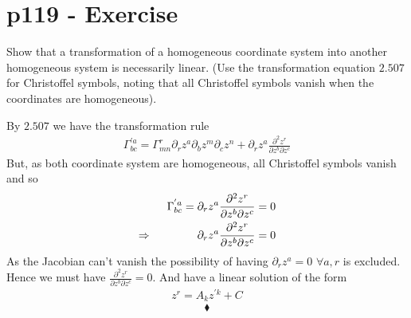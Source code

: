 \section{p119 - Exercise}
\begin{tcolorbox}
Show that a transformation of a homogeneous coordinate system  into another homogeneous system is necessarily linear. (Use the transformation equation $\mathbf{2.507}$ for Christoffel symbols, noting that all Christoffel symbols vanish  when the coordinates are homogeneous).
\end{tcolorbox}
By $2.507$ we have the transformation rule 
\begin{align}
\Gamma^{'a}_{bc} = \Gamma^{r}_{mn}\partial_r z^a\partial_b z^m \partial_c z^n + \partial_r z^a\frac{\partial^2 z^r}{\partial z^b \partial z^c} 
\end{align}
But, as both coordinate system are homogeneous, all Christoffel symbols vanish and so
\begin{align}
\Gamma^{'a}_{bc} = \partial_r z^a\frac{\partial^2 z^r}{\partial z^b \partial z^c} &=0\\
\Rightarrow \quad\quad\quad\quad \partial_r z^a\frac{\partial^2 z^r}{\partial z^b \partial z^c} &=0
\end{align}
As the Jacobian can't vanish the possibility of having $\partial_r z^a=0$ $\forall a, r$ is excluded. Hence we must have $\frac{\partial^2 z^r}{\partial z^b \partial z^c} =0$. And have a linear solution of the form
\begin{align}
z^r = A_k z^{'k}+C
\end{align}
$$\blacklozenge$$
\newpage

